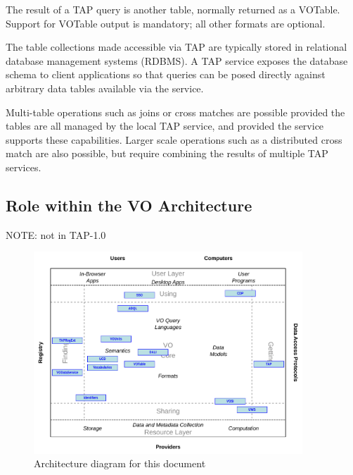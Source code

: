 \documentclass[11pt,letter]{ivoa}
\begin{document}
The result of a TAP query is another table, normally returned as a VOTable. 
Support for VOTable output is mandatory; all other formats are optional.

The table collections made accessible via TAP are typically stored in relational 
database management systems (RDBMS). A TAP service exposes the database schema 
to client applications so that queries can be posed directly against arbitrary 
data tables available via the service.

Multi-table operations such as joins or cross matches are possible provided the 
tables are all managed by the local TAP service, and provided the service 
supports these capabilities.  Larger scale operations such as a distributed 
cross match are also possible, but require combining the results of multiple TAP 
services.

\subsection{Role within the VO Architecture}

NOTE: not in TAP-1.0

\begin{figure}
\centering


\includegraphics[width=0.9\textwidth]{role_diagram.pdf}
\caption{Architecture diagram for this document}
\label{fig:archdiag}
\end{figure}
\end{document}
